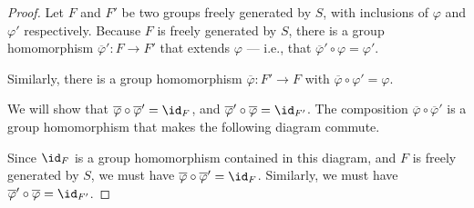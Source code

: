 \documentclass[10pt]{mypackage}
\begin{document}
\begin{proof}
  Let $F$ and $F'$ be two groups freely generated by $S$, with inclusions of $\varphi$ and $\varphi'$ respectively.
    Because $F$ is freely generated by $S$, there is a group homomorphism $\overline{\varphi}'\colon F\rightarrow F'$ that extends $\varphi$ --- i.e., that $\overline{\varphi}' \circ \varphi = \varphi'$.\newline

      Similarly, there is a group homomorphism $\overline{\varphi}\colon F'\rightarrow F$ with $\overline{\varphi}\circ \varphi' = \varphi$.
      \begin{center}
      \end{center}
      We will show that $\overline{\varphi}\circ \overline{\varphi}' = \id_{F}$, and $\overline{\varphi}'\circ \overline{\varphi} = \id_{F'}$. The composition $\overline{\varphi}\circ \overline{\varphi}'$ is a group homomorphism that makes the following diagram commute.
      \begin{center}
      \end{center}
      Since $\id_{F}$ is a group homomorphism contained in this diagram, and $F$ is freely generated by $S$, we must have $\overline{\varphi}\circ \overline{\varphi}' = \id_{F}$. Similarly, we must have $\overline{\varphi}' \circ \overline{\varphi} = \id_{F'}$.
\end{proof}
\end{document}
